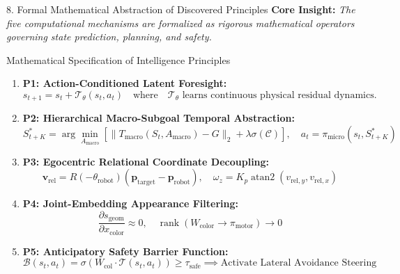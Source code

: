 \documentclass[aspectratio=169, 10pt]{beamer}
\begin{document}
\begin{frame}{8. Formal Mathematical Abstraction of Discovered Principles}
  \textbf{Core Insight:} \textit{The five computational mechanisms are formalized as rigorous mathematical operators governing state prediction, planning, and safety.}

  \vspace{0.15cm}
  \begin{block}{Mathematical Specification of Intelligence Principles}
    \footnotesize
    \begin{enumerate}
      \item \textbf{P1: Action-Conditioned Latent Foresight:}
      \begin{equation*}
        s_{t+1} = s_t + \mathcal{T}_{\theta}(s_t, a_t) \quad \text{where} \quad \mathcal{T}_{\theta} \text{ learns continuous physical residual dynamics.}
      \end{equation*}
      \item \textbf{P2: Hierarchical Macro-Subgoal Temporal Abstraction:}
      \begin{equation*}
        S^*_{t+K} = \arg\min_{A_{\mathrm{macro}}} \left[ \|T_{\mathrm{macro}}(S_t, A_{\mathrm{macro}}) - G\|_2 + \lambda \sigma(\mathcal{C}) \right], \quad a_t = \pi_{\mathrm{micro}}(s_t, S^*_{t+K})
      \end{equation*}
      \item \textbf{P3: Egocentric Relational Coordinate Decoupling:}
      \begin{equation*}
        \mathbf{v}_{\mathrm{rel}} = R(-\theta_{\mathrm{robot}}) (\mathbf{p}_{\mathrm{target}} - \mathbf{p}_{\mathrm{robot}}), \quad \omega_z = K_p \operatorname{atan2}(v_{\mathrm{rel}, y}, v_{\mathrm{rel}, x})
      \end{equation*}
      \item \textbf{P4: Joint-Embedding Appearance Filtering:}
      \begin{equation*}
        \frac{\partial s_{\mathrm{geom}}}{\partial x_{\mathrm{color}}} \approx 0, \quad \operatorname{rank}(W_{\mathrm{color}} \to \pi_{\mathrm{motor}}) \to 0
      \end{equation*}
      \item \textbf{P5: Anticipatory Safety Barrier Function:}
      \begin{equation*}
        \mathcal{B}(s_t, a_t) = \sigma(W_{\mathrm{col}} \cdot \mathcal{T}(s_t, a_t)) \ge \tau_{\mathrm{safe}} \implies \text{Activate Lateral Avoidance Steering}
      \end{equation*}
    \end{enumerate}
  \end{block}
\end{frame}
\end{document}
